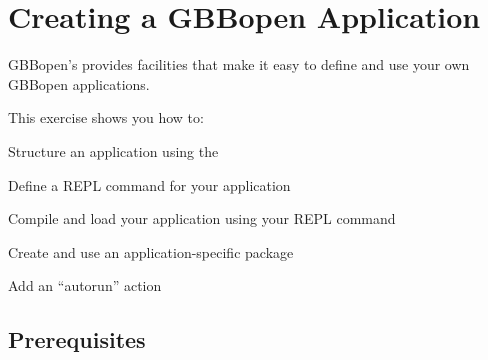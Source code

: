 \documentclass[10pt,twoside,english,pdftex]{article}
\begin{document}

\T\markright{}%
\T\pagestyle{plain}
\T\cleardoublepage
\W{}
\T\pagestyle{fancy}
\T\thispagestyle{fancybottom}
\T\renewcommand{\headrulewidth}{0pt}
\section{Creating a GBBopen Application}
\label{sec:application}%

GBBopen's  provides facilities
that make it easy to define and use your own GBBopen applications.

\fndocrule

This exercise shows you how to:
\begin{tightitemize}
\item Structure an application using the 
\item Define a REPL command for your application
\item Compile and load your application using your REPL command
\item Create and use an application-specific package
\item Add an ``autorun'' action
\end{tightitemize}

\fndocrule

\subsection*{Prerequisites}
\end{document}
